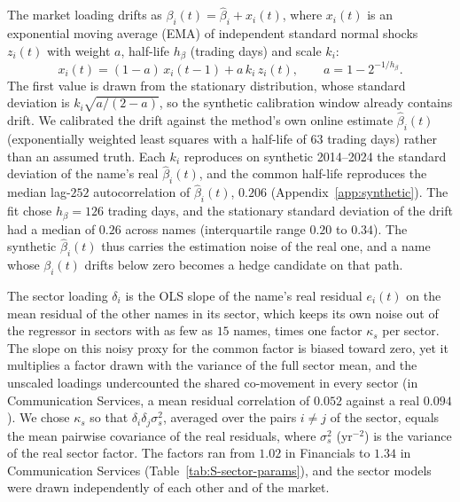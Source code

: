 The market loading drifts as $\beta_i(t) = \hat\beta_i + x_i(t)$, where $x_i(t)$ is an exponential moving average
(EMA) of independent standard normal shocks $z_i(t)$ with weight $a$, half-life $h_\beta$ (trading days) and scale
$k_i$:
\begin{equation}
  x_i(t) = (1 - a)\, x_i(t-1) + a\, k_i\, z_i(t), \qquad a = 1 - 2^{-1/h_\beta}.
  \label{eq:beta-drift}
\end{equation}
The first value is drawn from the stationary distribution, whose standard deviation is $k_i\sqrt{a/(2-a)}$, so the
synthetic calibration window already contains drift. We calibrated the drift against the method's own online
estimate $\hat\beta_i(t)$ (exponentially weighted least squares with a half-life of $63$ trading days) rather than an
assumed truth. Each $k_i$ reproduces on synthetic 2014--2024 the standard deviation of the name's real
$\hat\beta_i(t)$, and the common half-life reproduces the median lag-$252$ autocorrelation of $\hat\beta_i(t)$,
$0.206$ (Appendix~\ref{app:synthetic}). The fit chose $h_\beta = 126$ trading days, and the stationary standard
deviation of the drift had a median of $0.26$ across names (interquartile range $0.20$ to $0.34$). The synthetic
$\hat\beta_i(t)$ thus carries the estimation noise of the real one, and a name whose $\beta_i(t)$ drifts below zero
becomes a hedge candidate on that path.

The sector loading $\delta_i$ is the OLS slope of the name's real residual $e_i(t)$ on the mean residual of the other
names in its sector, which keeps its own noise out of the regressor in sectors with as few as $15$ names, times one
factor $\kappa_s$ per sector. The slope on this noisy proxy for the common factor is biased toward zero, yet it
multiplies a factor drawn with the variance of the full sector mean, and the unscaled loadings undercounted the shared
co-movement in every sector (in Communication Services, a mean residual correlation of $0.052$ against a real $0.094$).
We chose $\kappa_s$ so that $\delta_i \delta_j \sigma_s^2$, averaged over the pairs $i \ne j$ of the sector, equals
the mean pairwise covariance of the real residuals, where $\sigma_s^2$ (yr$^{-2}$) is the variance of the real sector
factor. The factors ran from $1.02$ in Financials to $1.34$ in Communication Services
(Table~\ref{tab:S-sector-params}), and the sector models were drawn independently of each other and of the market.

